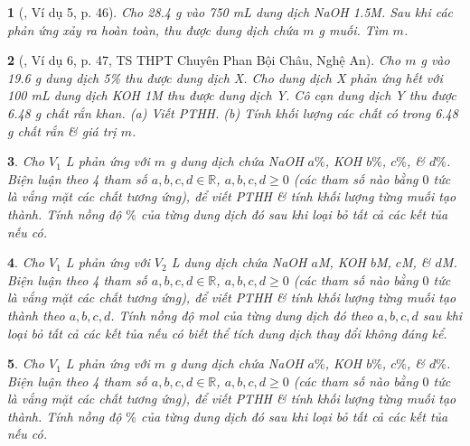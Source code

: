 \documentclass{article}
\newtheorem{baitoan}{}
\begin{document}
\begin{baitoan}[\cite{Truong_Long_Huong_bdhsg_Hoa_Hoc_9}, Ví dụ 5, p. 46]
	Cho {\rm28.4 g } vào {\rm750 mL} dung dịch {\rm NaOH 1.5M}. Sau khi các phản ứng xảy ra hoàn toàn, thu được dung dịch chứa $m$ {\rm g} muối. Tìm $m$.
\end{baitoan}

\begin{baitoan}[\cite{Truong_Long_Huong_bdhsg_Hoa_Hoc_9}, Ví dụ 6, p. 47, TS THPT Chuyên Phan Bội Châu, Nghệ An]
	Cho $m$ {\rm g } vào {\rm19.6 g} dung dịch {\rm{} 5\%} thu được dung dịch X. Cho dung dịch X phản ứng hết với {\rm100 mL} dung dịch {\rm KOH 1M} thu được dung dịch Y. Cô cạn dung dịch Y thu được {\rm6.48 g} chất rắn khan. (a) Viết {\rm PTHH}. (b) Tính khối lượng các chất có trong {\rm6.48 g} chất rắn \& giá trị $m$.
\end{baitoan}

\begin{baitoan}
	Cho $V_1$ {\rm L } phản ứng với $m$ {\rm g} dung dịch chứa {\rm NaOH $a\%$, KOH $b\%$,  $c\%$, \&  $d\%$}. Biện luận theo 4 tham số $a,b,c,d\in\mathbb{R}$, $a,b,c,d\ge0$ (các tham số nào bằng $0$ tức là vắng mặt các chất tương ứng), để viết {\rm PTHH} \& tính khối lượng từng muối tạo thành. Tính nồng độ $\%$ của từng dung dịch đó sau khi loại bỏ tất cả các kết tủa nếu có.
\end{baitoan}

\begin{baitoan}
	Cho $V_1$ {\rm L } phản ứng với $V_2$ {\rm L} dung dịch chứa {\rm NaOH $a$M, KOH $b$M,  $c$M, \&  $d$M}. Biện luận theo 4 tham số $a,b,c,d\in\mathbb{R}$, $a,b,c,d\ge0$ (các tham số nào bằng $0$ tức là vắng mặt các chất tương ứng), để viết {\rm PTHH} \& tính khối lượng từng muối tạo thành theo $a,b,c,d$. Tính nồng độ mol của từng dung dịch đó theo $a,b,c,d$ sau khi loại bỏ tất cả các kết tủa nếu có biết thể tích dung dịch thay đổi không đáng kể.
\end{baitoan}

\begin{baitoan}
	Cho $V_1$ {\rm L } phản ứng với $m$ {\rm g} dung dịch chứa {\rm NaOH $a\%$, KOH $b\%$,  $c\%$, \&  $d\%$}. Biện luận theo 4 tham số $a,b,c,d\in\mathbb{R}$, $a,b,c,d\ge0$ (các tham số nào bằng $0$ tức là vắng mặt các chất tương ứng), để viết {\rm PTHH} \& tính khối lượng từng muối tạo thành. Tính nồng độ $\%$ của từng dung dịch đó sau khi loại bỏ tất cả các kết tủa nếu có.
\end{baitoan}
\end{document}
